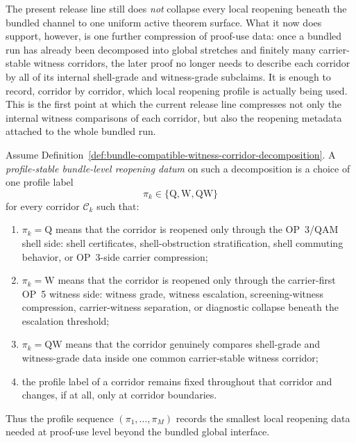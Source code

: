 \begin{remark}
\label{rem:status-of-the-first-bundle-level-reopening-compression-step}
The present release line still does \emph{not} collapse every local reopening beneath the bundled channel to one uniform active theorem surface. What it now does support, however, is one further compression of proof-use data: once a bundled run has already been decomposed into global stretches and finitely many carrier-stable witness corridors, the later proof no longer needs to describe each corridor by all of its internal shell-grade and witness-grade subclaims. It is enough to record, corridor by corridor, which local reopening profile is actually being used. This is the first point at which the current release line compresses not only the internal witness comparisons of each corridor, but also the reopening metadata attached to the whole bundled run.
\end{remark}

\begin{definition}
\label{def:profile-stable-bundle-level-reopening-data}
Assume Definition~\ref{def:bundle-compatible-witness-corridor-decomposition}. A \emph{profile-stable bundle-level reopening datum} on such a decomposition is a choice of one profile label
\[
\pi_k\in\{\mathrm{Q},\mathrm{W},\mathrm{QW}\}
\]
for every corridor $\mathcal C_k$ such that:
\begin{enumerate}[leftmargin=2em,label=(\roman*)]
\item $\pi_k=\mathrm{Q}$ means that the corridor is reopened only through the OP~3/QAM shell side: shell certificates, shell-obstruction stratification, shell commuting behavior, or OP~3-side carrier compression;
\item $\pi_k=\mathrm{W}$ means that the corridor is reopened only through the carrier-first OP~5 witness side: witness grade, witness escalation, screening-witness compression, carrier-witness separation, or diagnostic collapse beneath the escalation threshold;
\item $\pi_k=\mathrm{QW}$ means that the corridor genuinely compares shell-grade and witness-grade data inside one common carrier-stable witness corridor;
\item the profile label of a corridor remains fixed throughout that corridor and changes, if at all, only at corridor boundaries.
\end{enumerate}
Thus the profile sequence $(\pi_1,\ldots,\pi_M)$ records the smallest local reopening data needed at proof-use level beyond the bundled global interface.
\end{definition}

